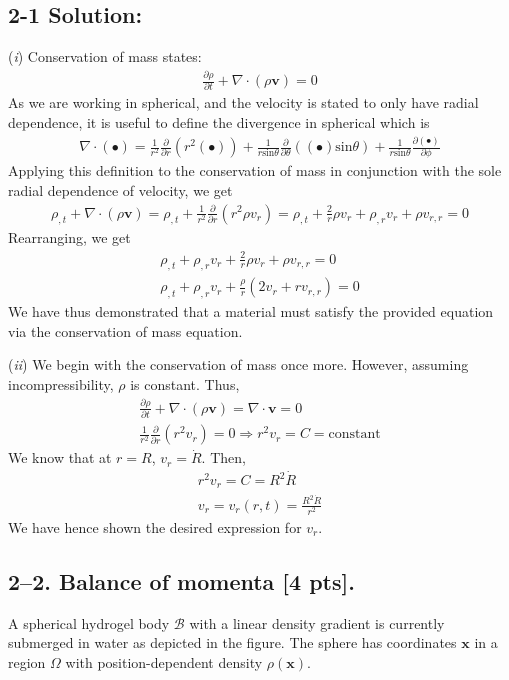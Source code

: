 \subsection*{\textbf{2-1 Solution:}}
(\textit{i}) Conservation of mass states:
\begin{gather*}
\frac{\partial\rho}{\partial t}+\nabla\cdot(\rho \bm{v})=0    
\end{gather*}
As we are working in spherical, and the velocity is stated to only have radial dependence, it is useful to define the divergence in spherical which is
\begin{gather*}
    \nabla\cdot(\bullet)=\frac{1}{r^2}\frac{\partial}{\partial r}(r^2(\bullet))+\frac{1}{r\text{sin}\theta}\frac{\partial}{\partial\theta}((\bullet)\text{sin}\theta)+\frac{1}{r\text{sin}\theta}\frac{\partial(\bullet)}{\partial\phi}
\end{gather*}
Applying this definition to the conservation of mass in conjunction with the sole radial dependence of velocity, we get
\begin{gather*}
    \rho_{,t}+\nabla\cdot(\rho\bm{v})=\rho_{,t}+\frac{1}{r^2}\frac{\partial}{\partial r}(r^2\rho v_r)=
    \rho_{,t}+\frac{2}{r}\rho v_r+ \rho_{,r}v_r+\rho v_{r,r}=0
\end{gather*}
Rearranging, we get
\begin{gather*}
    \rho_{,t}+\rho_{,r}v_r+\frac{2}{r}\rho v_r+\rho v_{r,r}=0\\
    \rho_{,t}+\rho_{,r}v_r+\frac{\rho}{r}(2 v_r+r v_{r,r})=0
\end{gather*}
We have thus demonstrated that a material must satisfy the provided equation via the conservation of mass equation.

(\textit{ii}) We begin with the conservation of mass once more. However, assuming incompressibility, $\rho$ is constant. Thus,
\begin{gather*}
    \frac{\partial\rho}{\partial t}+\nabla\cdot(\rho \bm{v})=\nabla\cdot \bm{v}=0 \\
    \frac{1}{r^2}\frac{\partial}{\partial r}(r^2v_r)=0\Rightarrow r^2v_r=C=\text{constant}    
\end{gather*}
We know that at $r=R$, $v_r=\dot{R}$. Then,
\begin{gather*}
    r^2v_r=C=R^2\dot{R}\\
    v_r=v_r(r,t)=\frac{R^2\dot{R}}{r^2}
\end{gather*}
We have hence shown the desired expression for $v_r$.

\medskip
\subsection*{2--2. \textbf{Balance of momenta} [4 pts].} A spherical hydrogel body $\mathcal{B}$ with a linear density gradient is currently submerged in water as depicted in the figure. 
The sphere has coordinates $\bm{x}$ in a region $\Omega$ with position-dependent density $\rho(\bm{x})$. 

